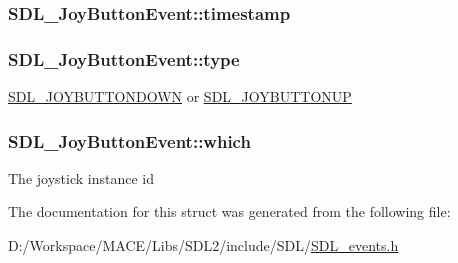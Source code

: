 \subsubsection[{\texorpdfstring{timestamp}{timestamp}}]{ S\+D\+L\+\_\+\+Joy\+Button\+Event\+::timestamp}\hypertarget{struct_s_d_l___joy_button_event_ab50b6f7d1ab3ac53df69fc2d6cf5fa2a}{}\label{struct_s_d_l___joy_button_event_ab50b6f7d1ab3ac53df69fc2d6cf5fa2a}
\subsubsection[{\texorpdfstring{type}{type}}]{ S\+D\+L\+\_\+\+Joy\+Button\+Event\+::type}\hypertarget{struct_s_d_l___joy_button_event_a8f3312a046d37fa2884b93f69c4cb655}{}\label{struct_s_d_l___joy_button_event_a8f3312a046d37fa2884b93f69c4cb655}
\hyperlink{_s_d_l__events_8h_a3b589e89be6b35c02e0dd34a55f3fccaa386ac978bc145a45883fe0adab70710b}{S\+D\+L\+\_\+\+J\+O\+Y\+B\+U\+T\+T\+O\+N\+D\+O\+WN} or \hyperlink{_s_d_l__events_8h_a3b589e89be6b35c02e0dd34a55f3fccaa76f91c81110f012e3a47cbbc0449e3c3}{S\+D\+L\+\_\+\+J\+O\+Y\+B\+U\+T\+T\+O\+N\+UP} 
\subsubsection[{\texorpdfstring{which}{which}}]{ S\+D\+L\+\_\+\+Joy\+Button\+Event\+::which}\hypertarget{struct_s_d_l___joy_button_event_a1679049adad7242b28420948fdc79044}{}\label{struct_s_d_l___joy_button_event_a1679049adad7242b28420948fdc79044}
The joystick instance id 

The documentation for this struct was generated from the following file\+:\begin{DoxyCompactItemize}
\item 
D\+:/\+Workspace/\+M\+A\+C\+E/\+Libs/\+S\+D\+L2/include/\+S\+D\+L/\hyperlink{_s_d_l__events_8h}{S\+D\+L\+\_\+events.\+h}\end{DoxyCompactItemize}
